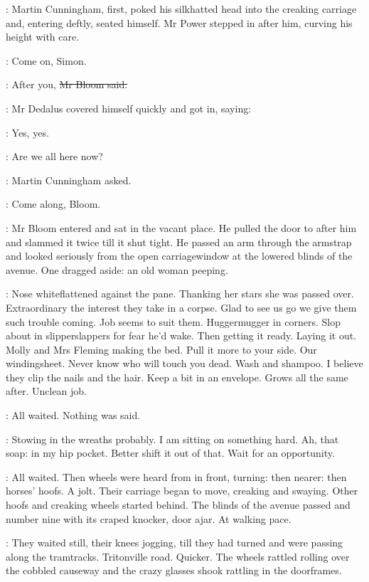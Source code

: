:
Martin Cunningham, first,
poked his silkhatted head into the creaking carriage
and, entering deftly, seated himself.
Mr Power stepped in after him,
curving his height with care.

\power:
Come on, Simon.

\Bloom:
After you,
\sout{Mr Bloom said.}

:
Mr Dedalus covered himself quickly and got in, saying:

\simon:
Yes, yes.

\cunningham:
Are we all here now?

:
Martin Cunningham asked.

\cunningham:
Come along, Bloom.

:
Mr Bloom entered and sat in the vacant place.
He pulled the door to after him
and slammed it twice till it shut tight.
He passed an arm through the armstrap
and looked seriously from the open carriagewindow
at the lowered blinds of the avenue.
One dragged aside:
an old woman peeping.

\BloomInt:
Nose whiteflattened against the pane.
Thanking her stars she was passed over.
Extraordinary the interest they take in a corpse.
Glad to see us go
we give them such trouble coming.
Job seems to suit them.
Huggermugger in corners.
Slop about in slipperslappers for fear he'd wake.
Then getting it ready.
Laying it out.
Molly and Mrs Fleming making the bed.
Pull it more to your side.
Our windingsheet.
Never know who will touch you dead.
Wash and shampoo.
I believe they clip the nails and the hair.
Keep a bit in an envelope.
Grows all the same after.
Unclean job.

:
All waited.
Nothing was said.

\BloomInt:
Stowing in the wreaths probably.
I am sitting on something hard.
Ah, that soap:
in my hip pocket.
Better shift it out of that.
Wait for an opportunity.

:
All waited.
Then wheels were heard from in front, turning:
then nearer:
then horses' hoofs.
A jolt.
Their carriage began to move, creaking and swaying.
Other hoofs and creaking wheels started behind.
The blinds of the avenue passed
and number nine with its craped knocker, door ajar.
At walking pace.

:
They waited still, their knees jogging, till they had turned
and were passing along the tramtracks.
Tritonville road.
Quicker.
The wheels
rattled rolling over the cobbled causeway
and the crazy glasses shook rattling in the doorframes.

